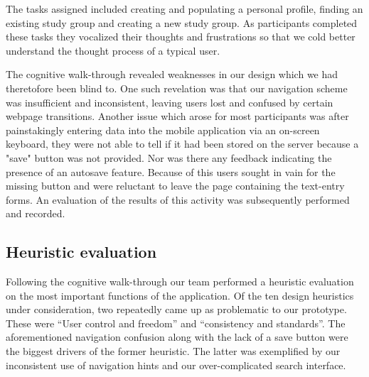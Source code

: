 \documentclass{sigchi-ext}
\begin{document}
The tasks assigned included creating and populating a personal profile, finding an existing study
group and creating a new study group. As participants completed these tasks they vocalized their
thoughts and frustrations so that we cold better understand the thought process of a typical user.

The cognitive walk-through revealed weaknesses in our design which we had theretofore been blind to.
One such revelation was that our navigation scheme was insufficient and inconsistent, leaving users
lost and confused by certain webpage transitions. Another issue which arose for most participants
was after painstakingly entering data into the mobile application via an on-screen keyboard, they
were not able to tell if it had been stored on the server because a "save" button was not provided.
Nor was there any feedback indicating the presence of an autosave feature. Because of this users
sought in vain for the missing button and were reluctant to leave the page containing the text-entry
forms. An evaluation of the results of this activity was subsequently performed and recorded.


\subsection{Heuristic evaluation}

Following the cognitive walk-through our team performed a heuristic evaluation on the most important
functions of the application. Of the ten design heuristics under consideration, two repeatedly came
up as problematic to our prototype. These were ``User control and freedom'' and ``consistency and
standards''. The aforementioned navigation confusion along with the lack of a save button were the
biggest drivers of the former heuristic. The latter was exemplified by our inconsistent use of
navigation hints and our over-complicated search interface.
\end{document}
